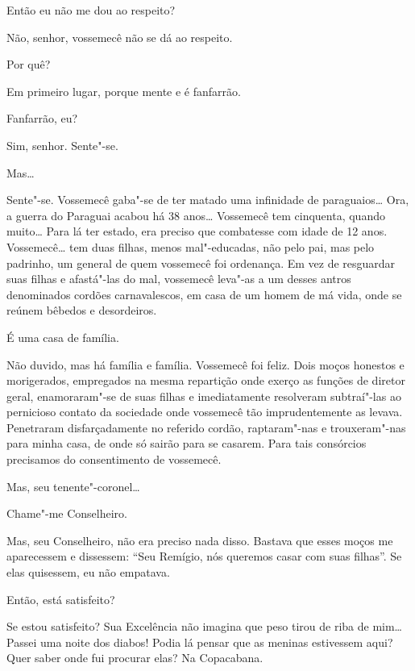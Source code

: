  Então eu não me dou ao respeito?

 Não, senhor, vossemecê não se dá ao respeito.

 Por quê?

 Em primeiro lugar, porque mente e é fanfarrão.

  Fanfarrão, eu?

 Sim, senhor. Sente"-se.

 Mas\ldots{}

 Sente"-se.   Vossemecê gaba"-se de
ter matado uma infinidade de paraguaios\ldots{} Ora, a guerra do Paraguai acabou há
38 anos\ldots{} Vossemecê tem cinquenta, quando muito\ldots{} Para lá ter
estado, era preciso que combatesse com idade de 12 anos.   Vossemecê\ldots{} tem duas filhas, menos mal"-educadas, não pelo
pai, mas pelo padrinho, um general de quem vossemecê foi ordenança. Em vez de
resguardar suas filhas e afastá"-las do mal, vossemecê leva"-as a um desses antros
denominados cordões carnavalescos, em casa de um homem de má vida, onde se
reúnem bêbedos e desordeiros.

 É uma casa de família.

 Não duvido, mas há família e família.   Vossemecê foi feliz. Dois moços honestos e morigerados,
empregados na mesma repartição onde exerço as funções de diretor geral,
enamoraram"-se de suas filhas e imediatamente resolveram subtraí"-las ao
pernicioso contato da sociedade onde vossemecê tão imprudentemente as levava.
Penetraram disfarçadamente no referido cordão, raptaram"-nas e trouxeram"-nas para
minha casa, de onde só sairão para se casarem. Para tais consórcios precisamos
do consentimento de vossemecê.

  Mas, seu
tenente"-coronel\ldots{}

 Chame"-me Conselheiro.

 Mas, seu Conselheiro, não era preciso nada disso. Bastava que
esses moços me aparecessem e dissessem: ``Seu Remígio, nós queremos
casar com suas filhas''. Se elas quisessem, eu não empatava.

 Então, está satisfeito?

 Se estou satisfeito? Sua Excelência não imagina que peso
tirou de riba de mim\ldots{} Passei uma noite dos diabos! Podia lá pensar que as
meninas estivessem aqui? Quer saber onde fui procurar elas? Na Copacabana.

